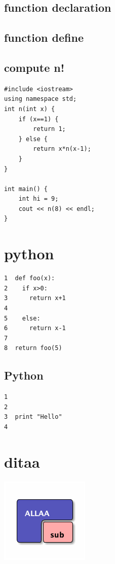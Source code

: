 \documentclass[12pt,a4paper]{article}
\begin{document}
\subsection*{function declaration}
\label{sec:org6bcafae}

\subsection*{function define}
\label{sec:org6253a4f}

\subsection*{compute n!}
\label{sec:orgf7f05ed}
\begin{verbatim}
#include <iostream>
using namespace std;
int n(int x) {
    if (x==1) {
        return 1;
    } else {
        return x*n(x-1);
    }
}

int main() {
    int hi = 9;
    cout << n(8) << endl;
}

\end{verbatim}

\section*{python}
\label{sec:org8f7f567}
\begin{verbatim}
1  def foo(x):
2    if x>0:
3      return x+1
4  
5    else:
6      return x-1
7  
8  return foo(5)
\end{verbatim}
\subsection*{Python}
\label{sec:org09ddde3}
\begin{verbatim}
1  
2  
3  print "Hello"
4  
\end{verbatim}

\section*{ditaa}
\label{sec:org32995ab}
\begin{center}
\includegraphics[width=.9\linewidth]{blue.png}
\end{center}
\end{document}
